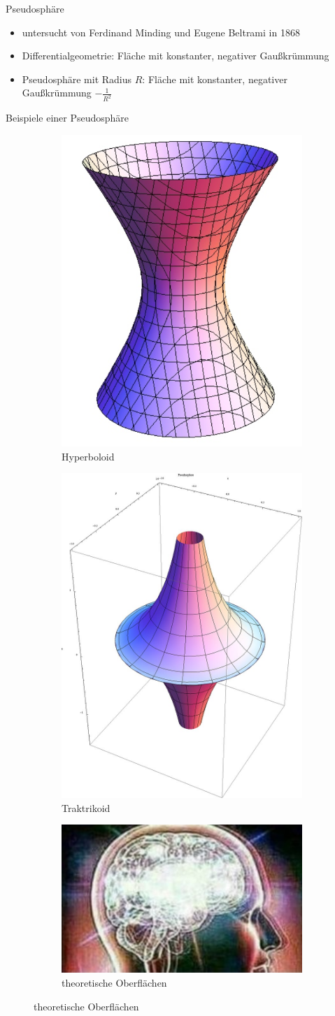 \documentclass[12pt]{beamer}
\begin{document}
\begin{frame}{Pseudosphäre}

\begin{itemize}
\item untersucht von Ferdinand Minding und Eugene Beltrami in 1868
\item Differentialgeometrie: Fläche mit konstanter, negativer Gaußkrümmung
\item Pseudosphäre mit Radius $R$: Fläche mit konstanter, negativer Gaußkrümmung $-\frac{1}{R^2}$ \cite{pseudo_mathcurve}
\end{itemize}

\end{frame}

\begin{frame}{Beispiele einer Pseudosphäre}
\begin{figure}
\begin{subfigure}{.5\textwidth}
  \centering
  \includegraphics[width=.3\linewidth]{hyperboloid.png}
  \caption{Hyperboloid}
\end{subfigure}%
\begin{subfigure}{.5\textwidth}
  \centering
  \includegraphics[width=.3\linewidth]{pseudosphere.png}
  \caption{Traktrikoid}
\end{subfigure}
\begin{subfigure}{.5\textwidth}
  \centering
  \includegraphics[width=.3\linewidth]{theo_surface.png}
  \caption{theoretische Oberflächen}
\end{subfigure}
\end{figure}

\end{frame}
\end{document}
